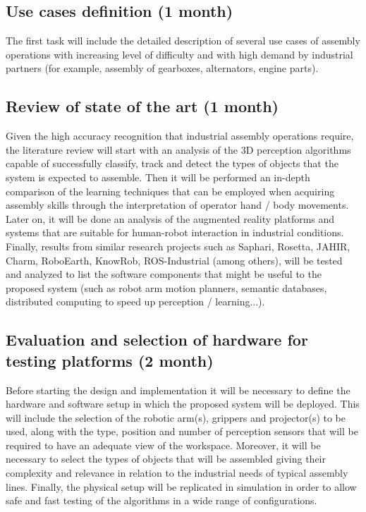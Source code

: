 \subsection{Use cases definition (1 month)}

The first task will include the detailed description of several use cases of assembly operations with increasing level of difficulty and with high demand by industrial partners (for example, assembly of gearboxes, alternators, engine parts).


\subsection{Review of state of the art (1 month)}

Given the high accuracy recognition that industrial assembly operations require, the literature review will start with an analysis of the 3D perception algorithms capable of successfully classify, track and detect the types of objects that the system is expected to assemble. Then it will be performed an in-depth comparison of the learning techniques that can be employed when acquiring assembly skills through the interpretation of operator hand / body movements. Later on, it will be done an analysis of the augmented reality platforms and systems that are suitable for human-robot interaction in industrial conditions.
Finally, results from similar research projects such as Saphari, Rosetta, JAHIR, Charm, RoboEarth, KnowRob, ROS-Industrial (among others), will be tested and analyzed to list the software components that might be useful to the proposed system (such as robot arm motion planners, semantic databases, distributed computing to speed up perception / learning...).


\subsection{Evaluation and selection of hardware for testing platforms (2 month)}

Before starting the design and implementation it will be necessary to define the hardware and software setup in which the proposed system will be deployed. This will include the selection of the robotic arm(s), grippers and projector(s) to be used, along with the type, position and number of perception sensors that will be required to have an adequate view of the workspace. Moreover, it will be necessary to select the types of objects that will be assembled giving their complexity and relevance in relation to the industrial needs of typical assembly lines.
Finally, the physical setup will be replicated in simulation in order to allow safe and fast testing of the algorithms in a wide range of configurations.


